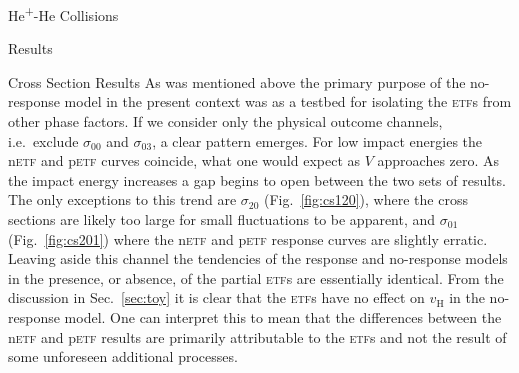 \documentclass[letterpaper, 11 pt]{report}
\begin{document}
\begin{chapter}{\texorpdfstring{He\textsuperscript{+}}{He+}-He Collisions \label{chap:hephe}}
\begin{section}{Results \label{sec:hephe-disc}}
\begin{subsection}{Cross Section Results \label{sec:hephe-res}}
         As was mentioned above the primary purpose of the no-response model in the present context was
         as a testbed for isolating the \textsc{etf}s from other phase factors. If we consider only the
         physical outcome channels, i.e.\ exclude $\sigma_{00}$ and $\sigma_{03}$, a clear pattern
         emerges. For low impact energies the n\textsc{etf} and p\textsc{etf} curves coincide, what one
         would expect as $V$ approaches zero. As the impact energy increases a gap begins to open
         between the two sets of results. The only exceptions to this trend are $\sigma_{20}$
         (Fig.~\ref{fig:cs120}), where the cross sections are likely too large for small fluctuations to
         be apparent, and $\sigma_{01}$ (Fig.~\ref{fig:cs201}) where the n\textsc{etf} and p\textsc{etf}
         response curves are slightly erratic. Leaving aside this channel the tendencies of the response
         and no-response models in the presence, or absence, of the partial \textsc{etf}s are
         essentially identical. From the discussion in Sec.~\ref{sec:toy} it is clear that the
         \textsc{etf}s have no effect on $v_\mathrm{H}$ in the no-response model. One can interpret this
         to mean that the differences between the n\textsc{etf} and p\textsc{etf} results are primarily
         attributable to the \textsc{etf}s and not the result of some unforeseen additional processes.


\end{subsection}
\end{section}
\end{chapter}
\end{document}
